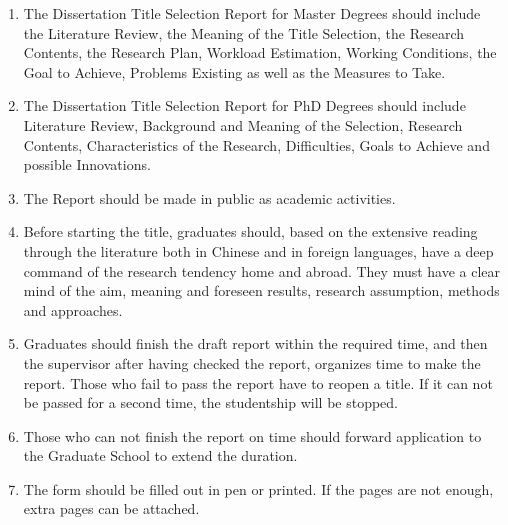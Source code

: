 \begin{enumerate}[label={\arabic*.}, leftmargin=2.2em, itemsep=2pt, topsep=2pt, parsep=0pt]
    \item The Dissertation Title Selection Report for Master Degrees should include the Literature Review, the Meaning of the Title Selection, the Research Contents, the Research Plan, Workload Estimation, Working Conditions, the Goal to Achieve, Problems Existing as well as the Measures to Take.
    \item The Dissertation Title Selection Report for PhD Degrees should include Literature Review, Background and Meaning of the Selection, Research Contents, Characteristics of the Research, Difficulties, Goals to Achieve and possible Innovations.
    \item The Report should be made in public as academic activities.
    \item Before starting the title, graduates should, based on the extensive reading through the literature both in Chinese and in foreign languages, have a deep command of the research tendency home and abroad. They must have a clear mind of the aim, meaning and foreseen results, research assumption, methods and approaches.
    \item Graduates should finish the draft report within the required time, and then the supervisor after having checked the report, organizes time to make the report. Those who fail to pass the report have to reopen a title. If it can not be passed for a second time, the studentship will be stopped.
    \item Those who can not finish the report on time should forward application to the Graduate School to extend the duration.
    \item The form should be filled out in pen or printed. If the pages are not enough, extra pages can be attached.
\end{enumerate}
